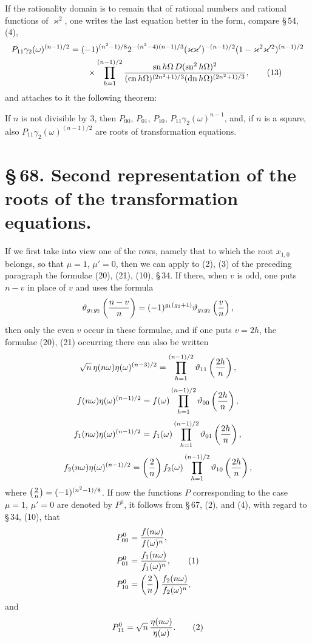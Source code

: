 \documentclass[11pt]{article}
\providecommand{\sn}{\operatorname{sn}}
\providecommand{\cn}{\operatorname{cn}}
\providecommand{\dn}{\operatorname{dn}}
\begin{document}
If the rationality domain is to remain that of rational numbers and rational functions of $\varkappa^2$, one writes the last equation better in the form, compare \S\,54, (4),
\begin{align}
P_{11}\gamma_2(\omega)^{(n-1)/2}
&=(-1)^{(n^2-1)/8}2^{-(n^2-4)(n-1)/3}
(\varkappa\varkappa')^{-(n-1)/2}(1-\varkappa^2\varkappa'^2)^{(n-1)/2}\notag\\
&\qquad\times
\prod_{h=1}^{(n-1)/2}{\sn h\Omega\,D(\sn^2h\Omega)^2\over
(\cn h\Omega)^{(2n^2+1)/3}(\dn h\Omega)^{(2n^2+1)/3}},
\tag{13}
\end{align}
and attaches to it the following theorem:

If $n$ is not divisible by $3$, then $P_{00}$, $P_{01}$, $P_{10}$, $P_{11}\gamma_2(\omega)^{n-1}$, and, if $n$ is a square, also $P_{11}\gamma_2(\omega)^{(n-1)/2}$ are roots of transformation equations.

\section*{\S\,68. Second representation of the roots of the transformation equations.}

If we first take into view one of the rows, namely that to which the root $x_{1,0}$ belongs, so that $\mu=1$, $\mu'=0$, then we can apply to (2), (3) of the preceding paragraph the formulae (20), (21), (10), \S\,34. If there, when $v$ is odd, one puts $n-v$ in place of $v$ and uses the formula
\[
\vartheta_{g_1g_2}\left({n-v\over n}\right)=(-1)^{g_1(g_2+1)}\vartheta_{g_1g_2}\left({v\over n}\right),
\]
then only the even $v$ occur in these formulae, and if one puts $v=2h$, the formulae (20), (21) occurring there can also be written
\[
\sqrt n\,\eta(n\omega)\eta(\omega)^{(n-3)/2}
=\prod_{h=1}^{(n-1)/2}\vartheta_{11}\left({2h\over n}\right),
\]
\[
f(n\omega)\eta(\omega)^{(n-1)/2}=f(\omega)\prod_{h=1}^{(n-1)/2}\vartheta_{00}\left({2h\over n}\right),
\]
\[
f_1(n\omega)\eta(\omega)^{(n-1)/2}=f_1(\omega)\prod_{h=1}^{(n-1)/2}\vartheta_{01}\left({2h\over n}\right),
\]
\[
f_2(n\omega)\eta(\omega)^{(n-1)/2}=\left({2\over n}\right)f_2(\omega)\prod_{h=1}^{(n-1)/2}\vartheta_{10}\left({2h\over n}\right),
\]
where $\left({2\over n}\right)=(-1)^{(n^2-1)/8}$. If now the functions $P$ corresponding to the case $\mu=1$, $\mu'=0$ are denoted by $P^0$, it follows from \S\,67, (2), and (4), with regard to \S\,34, (10), that
\begin{align}
P_{00}^0&={f(n\omega)\over f(\omega)^n},\notag\\
P_{01}^0&={f_1(n\omega)\over f_1(\omega)^n},\tag{1}\\
P_{10}^0&=\left({2\over n}\right){f_2(n\omega)\over f_2(\omega)^n},\notag
\end{align}
and
\begin{equation}
P_{11}^0=\sqrt n\,{\eta(n\omega)\over\eta(\omega)}.
\tag{2}
\end{equation}
\end{document}
